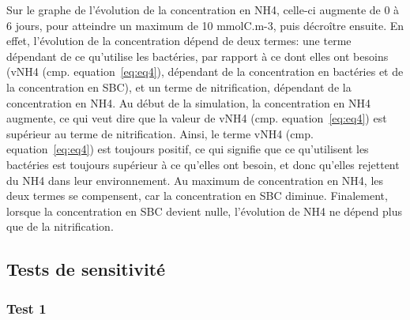 \par{
Sur le graphe de l'\'evolution de la concentration en NH4, celle-ci augmente de 0 \`a 6 jours, pour atteindre
un maximum de 10 mmolC.m-3, puis d\'ecro\^itre ensuite. En effet, l'\'evolution de la concentration d\'epend
de deux termes: une terme d\'ependant de ce qu'utilise les bact\'eries, par rapport \`a ce dont elles ont
besoins (vNH4 (cmp. equation~\ref{eq:eq4}), d\'ependant de la concentration en bact\'eries et de la concentration en SBC), et un terme
de nitrification, d\'ependant de la concentration en NH4. Au d\'ebut de la simulation, la concentration en
NH4 augmente, ce qui veut dire que la valeur de vNH4 (cmp. equation~\ref{eq:eq4}) est sup\'erieur au terme de nitrification. Ainsi, le terme
vNH4 (cmp. equation~\ref{eq:eq4}) est toujours positif, ce qui signifie que ce qu'utilisent les bact\'eries est toujours sup\'erieur \`a ce
qu'elles ont besoin, et donc qu'elles rejettent du NH4 dans leur environnement. Au maximum de concentration
en NH4, les deux termes se compensent, car la concentration en SBC diminue. Finalement, lorsque la
concentration en SBC devient nulle, l'\'evolution de NH4 ne d\'epend plus que de la nitrification.
}

\FloatBarrier
\newpage
\subsection{Tests de sensitivit\'e}
\subsubsection{Test 1}

